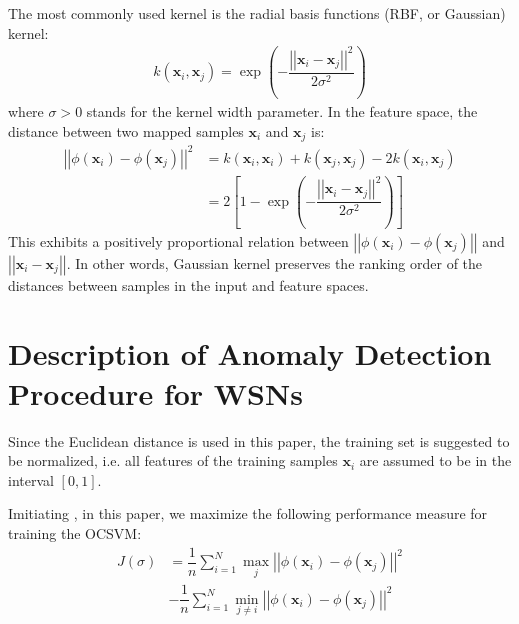 \documentclass[conference]{IEEEtran}
\begin{document}
The most commonly used kernel is the radial basis functions (RBF, or Gaussian) kernel:
\begin{align}
k \left( \mathbf{x}_i, \mathbf{x}_j\right) = \exp \left( - \dfrac{\left|\left| \mathbf{x}_i - \mathbf{x}_j \right|\right|^2}{2 \sigma^2} \right)
\end{align}
where $\sigma > 0$ stands for the kernel width parameter. In the feature space, the distance between two mapped samples $\mathbf{x}_i$ and $\mathbf{x}_j$ is:
\begin{align}
\left|\left| \phi \left( \mathbf{x}_i \right) - \phi \left( \mathbf{x}_j \right) \right|\right|^2 &= k \left( \mathbf{x}_i, \mathbf{x}_i\right) + k \left( \mathbf{x}_j, \mathbf{x}_j\right) - 2 k \left( \mathbf{x}_i, \mathbf{x}_j\right) \nonumber \\
&= 2 \left[ 1 -  \exp \left( - \dfrac{\left|\left| \mathbf{x}_i - \mathbf{x}_j \right|\right|^2}{2 \sigma^2}  \right) \right]
\end{align}
This exhibits a positively proportional relation between $\left|\left| \phi \left( \mathbf{x}_i \right) - \phi \left( \mathbf{x}_j \right) \right|\right|$ and $\left|\left| \mathbf{x}_i - \mathbf{x}_j \right|\right|$. In other words, Gaussian kernel preserves the ranking order of the distances between samples in the input and feature spaces.

\section{Description of Anomaly Detection Procedure for WSNs}\label{sec:implementation}

Since the Euclidean distance is used in this paper, the training set is suggested to be normalized, i.e. all features of the training samples $\mathbf{x}_i$ are assumed to be in the interval $\left[ 0, 1 \right]$.

Imitiating \cite{Xiao2014}, in this paper, we maximize the following performance measure for training the OCSVM:
\begin{align}
J (\sigma) &= \dfrac{1}{n} \sum _{i=1}^N \max_j \left|\left| \phi \left( \mathbf{x}_i \right) - \phi \left( \mathbf{x}_j \right) \right|\right|^2 \nonumber \\
&- \dfrac{1}{n} \sum _{i=1}^N \min_{j \ne i} \left|\left| \phi \left( \mathbf{x}_i \right) - \phi \left( \mathbf{x}_j \right) \right|\right|^2 
\end{align}
\end{document}
